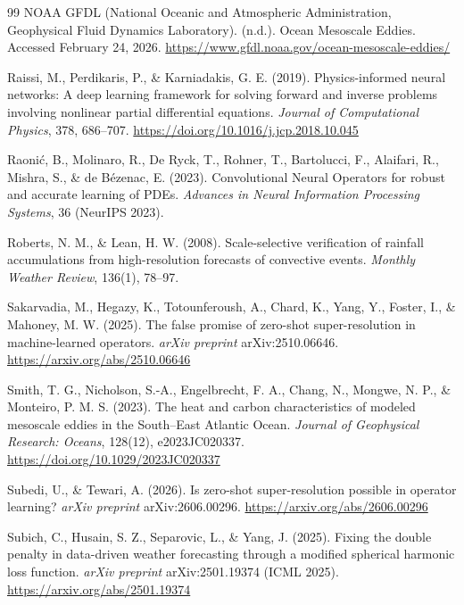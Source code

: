 \documentclass[11pt]{article}
\begin{document}
\begin{thebibliography}{99}
 NOAA GFDL (National Oceanic and Atmospheric Administration, Geophysical Fluid Dynamics Laboratory). (n.d.). Ocean Mesoscale Eddies. Accessed February 24, 2026. \url{https://www.gfdl.noaa.gov/ocean-mesoscale-eddies/}

 Raissi, M., Perdikaris, P., \& Karniadakis, G. E. (2019). Physics-informed neural networks: A deep learning framework for solving forward and inverse problems involving nonlinear partial differential equations. \textit{Journal of Computational Physics}, 378, 686--707. \url{https://doi.org/10.1016/j.jcp.2018.10.045}

 Raoni\'c, B., Molinaro, R., De Ryck, T., Rohner, T., Bartolucci, F., Alaifari, R., Mishra, S., \& de B\'ezenac, E. (2023). Convolutional Neural Operators for robust and accurate learning of PDEs. \textit{Advances in Neural Information Processing Systems}, 36 (NeurIPS 2023).

 Roberts, N. M., \& Lean, H. W. (2008). Scale-selective verification of rainfall accumulations from high-resolution forecasts of convective events. \textit{Monthly Weather Review}, 136(1), 78--97.

 Sakarvadia, M., Hegazy, K., Totounferoush, A., Chard, K., Yang, Y., Foster, I., \& Mahoney, M. W. (2025). The false promise of zero-shot super-resolution in machine-learned operators. \textit{arXiv preprint} arXiv:2510.06646. \url{https://arxiv.org/abs/2510.06646}

 Smith, T. G., Nicholson, S.-A., Engelbrecht, F. A., Chang, N., Mongwe, N. P., \& Monteiro, P. M. S. (2023). The heat and carbon characteristics of modeled mesoscale eddies in the South--East Atlantic Ocean. \textit{Journal of Geophysical Research: Oceans}, 128(12), e2023JC020337. \url{https://doi.org/10.1029/2023JC020337}

 Subedi, U., \& Tewari, A. (2026). Is zero-shot super-resolution possible in operator learning? \textit{arXiv preprint} arXiv:2606.00296. \url{https://arxiv.org/abs/2606.00296}

 Subich, C., Husain, S. Z., Separovic, L., \& Yang, J. (2025). Fixing the double penalty in data-driven weather forecasting through a modified spherical harmonic loss function. \textit{arXiv preprint} arXiv:2501.19374 (ICML 2025). \url{https://arxiv.org/abs/2501.19374}


\end{thebibliography}
\end{document}
